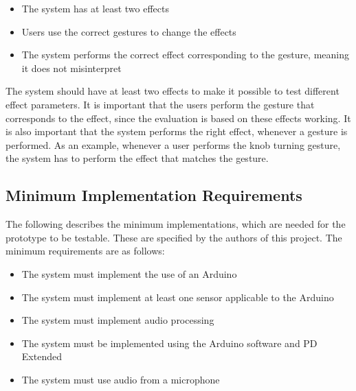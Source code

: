 \begin{itemize}
	\item The system has at least two effects
	\item Users use the correct gestures to change the effects
	\item The system performs the correct effect corresponding to the gesture, meaning it does not misinterpret 
\end{itemize}

The system should have at least two effects to make it possible to test different effect parameters. It is important that the users perform the gesture that corresponds to the effect, since the evaluation is based on these effects working. It is also important that the system performs the right effect, whenever a gesture is performed. As an example, whenever a user performs the knob turning gesture, the system has to perform the effect that matches the gesture.  

\subsection{Minimum Implementation Requirements}

The following describes the minimum implementations, which are needed for the prototype to be testable. These are specified by the authors of this project. The minimum requirements are as follows:

\begin{itemize}
	\item The system must implement the use of an Arduino
	\item The system must implement at least one sensor applicable to the Arduino
	\item The system must implement audio processing
	\item The system must be implemented using the Arduino software and PD Extended
	\item The system must use audio from a microphone
\end{itemize}
